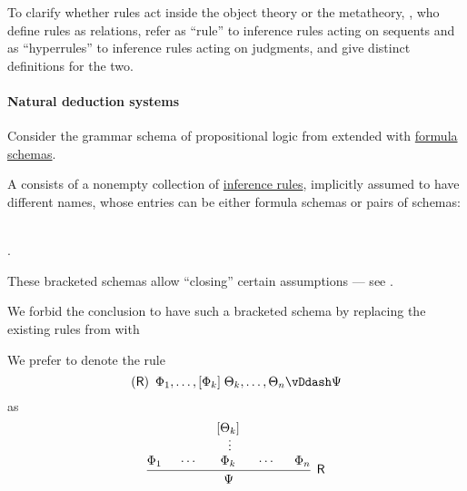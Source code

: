 \begin{remark}
  To clarify whether rules act inside the object theory or the metatheory, , who define rules as relations, refer as \enquote{rule} to inference rules acting on sequents and as \enquote{hyperrules} to inference rules acting on judgments, and give distinct definitions for the two.
\end{remark}

\paragraph{Natural deduction systems}

\begin{definition}\label{def:propositional_natural_deduction_system}\mimprovised
  Consider the grammar schema of propositional logic from  extended with \hyperref[def:propositional_formula_schema]{formula schemas}.

  A  consists of a nonempty collection of \hyperref[def:inference_rule]{inference rules}, implicitly assumed to have different names, whose entries can be either formula schemas or pairs of schemas:
  \begin{bnf*}
     { \bnfor} \\
    .
  \end{bnf*}

  These bracketed schemas allow \enquote{closing} certain assumptions --- see .

  We forbid the conclusion to have such a bracketed schema by replacing the existing rules from  with
  \begin{bnf*}
     {}
  \end{bnf*}

  We prefer to denote the rule
  \begin{equation*}
    (\logic{R}) \enspace \Phi_1, \ldots, [\Phi_k] \thickspace \Theta_k, \ldots, \Theta_n \vDdash \Psi
  \end{equation*}
  as
  \begin{equation*}
    \begin{prooftree}
      \hypo{ \Phi_1 }
      \hypo{ \cdots }
      \hypo{ [\Theta_k] }
      \ellipsis {} { \Phi_k }
      \hypo{ \cdots }
      \hypo{ \Phi_n }
      \infer5[\logic{R}]{ \Psi }
    \end{prooftree}
  \end{equation*}
\end{definition}
